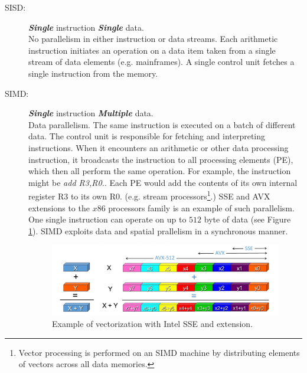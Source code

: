 \begin{description}
\item[SISD:] \textit{\textbf{Single}} instruction \textit{\textbf{Single}}
data.\hfill\\
No parallelism in either instruction or data streams. Each arithmetic
instruction initiates an operation on a data item taken from a single stream of data elements (e.g. mainframes). A single control unit fetches a single instruction from the memory.
\item[SIMD:] \textit{\textbf{Single}} instruction
\textit{\textbf{Multiple}} data. \hfill \\ Data parallelism. The same
instruction is executed on a batch of different data. The control unit is
responsible for fetching and interpreting instructions. When it encounters an
arithmetic or other data processing instruction, it broadcasts the instruction
to all processing elements (PE), which then all perform the same operation. For
example, the instruction might be \textit{add R3,R0.}. Each PE would add the
contents of its own internal register R3 to its own R0. (e.g. stream
processors\footnote{Vector processing is performed on an SIMD machine by distributing
elements of vectors across all data memories.}.) SSE and AVX extensions to the $x86$ processors family is an example of such parallelism. One single instruction can operate on up to $512$ byte of data (see Figure \ref{fig:SSEvectorization}). SIMD exploits data and spatial prallelism in a synchronous manner.

\begin{figure}
	\centering
	\includegraphics[width=1.0\textwidth]{./images/parallel_programming/vectorization_example}
	\caption{Example of vectorization with Intel SSE and extension.}
	\label{fig:SSEvectorization}
\end{figure}


\end{description}
